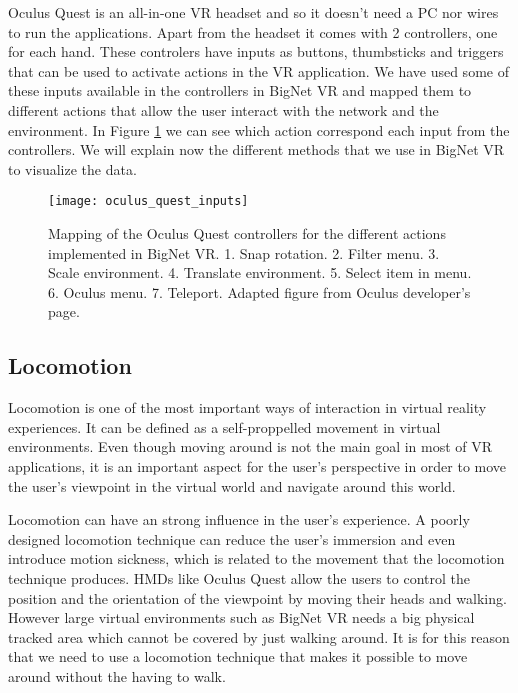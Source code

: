 Oculus Quest is an all-in-one VR headset and so it doesn't need a PC nor wires to run the applications. Apart from the headset it comes with 2 controllers, one for each hand. These controlers have inputs as buttons, thumbsticks and triggers that can be used to activate actions in the VR application. We have used some of these inputs available in the controllers in BigNet VR and mapped them to different actions that allow the user interact with the network and the environment. In Figure \ref{fig:oculus_quest_inputs} we can see which action correspond each input from the controllers. We will explain now the different methods that we use in BigNet VR to visualize the data.

\begin{figure}[h!]
    \centering%
    \texttt{[image: oculus\_quest\_inputs]}
    \caption{Mapping of the Oculus Quest controllers for the different actions implemented in BigNet VR. 1. Snap rotation. 2. Filter menu. 3. Scale environment. 4. Translate environment. 5. Select item in menu. 6. Oculus menu. 7. Teleport. Adapted figure from Oculus developer's page\cite{oculus_inputs}.}
    \label{fig:oculus_quest_inputs}
\end{figure}%

\subsection{Locomotion}
Locomotion is one of the most important ways of interaction in virtual reality experiences. It can be defined as a self-proppelled movement in virtual environments. Even though moving around is not the main goal in most of VR applications, it is an important aspect for the user's perspective in order to move the user's viewpoint in the virtual world and navigate around this world.

Locomotion can have an strong influence in the user's experience. A poorly designed locomotion technique can reduce the user's immersion and even introduce motion sickness, which is related to the movement that the locomotion technique produces. HMDs like Oculus Quest allow the users to control the position and the orientation of the viewpoint by moving their heads and walking. However large virtual environments such as BigNet VR needs a big physical tracked area which cannot be covered by just walking around. It is for this reason that we need to use a locomotion technique that makes it possible to move around without the having to walk\cite{locomotion_technique}.

